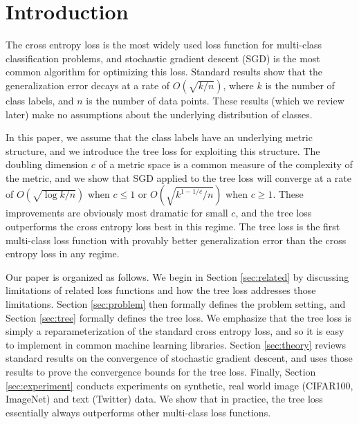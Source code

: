 \documentclass[twoside]{article}
\begin{document}
\section{Introduction}


The cross entropy loss is the most widely used loss function for multi-class classification problems,
and stochastic gradient descent (SGD) is the most common algorithm for optimizing this loss.
Standard results show that the generalization error decays at a rate of $O(\sqrt{k/n})$,
where $k$ is the number of class labels,
and $n$ is the number of data points.
These results (which we review later) make no assumptions about the underlying distribution of classes.

In this paper,
we assume that the class labels have an underlying metric structure,
and we introduce the tree loss for exploiting this structure.
The doubling dimension $c$ of a metric space is a common measure of the complexity of the metric,
and we show that SGD applied to the tree loss will converge at a rate of $O(\sqrt{\log k/n})$ when $c\le 1$ or $O(\sqrt{k^{1-1/c}/n})$ when $c\ge 1$.
These improvements are obviously most dramatic for small $c$,
and the tree loss outperforms the cross entropy loss best in this regime.
The tree loss is the first multi-class loss function with provably better generalization error than the cross entropy loss in any regime.

Our paper is organized as follows.
We begin in Section \ref{sec:related} by discussing limitations of related loss functions and how the tree loss addresses those limitations.
Section \ref{sec:problem} then formally defines the problem setting, and Section \ref{sec:tree} formally defines the tree loss.
We emphasize that the tree loss is simply a reparameterization of the standard cross entropy loss,
and so it is easy to implement in common machine learning libraries.
Section \ref{sec:theory} reviews standard results on the convergence of stochastic gradient descent,
and uses those results to prove the convergence bounds for the tree loss.
Finally, Section \ref{sec:experiment} conducts experiments on synthetic, real world image (CIFAR100, ImageNet) and text (Twitter) data.
We show that in practice, the tree loss essentially always outperforms other multi-class loss functions.
\end{document}
